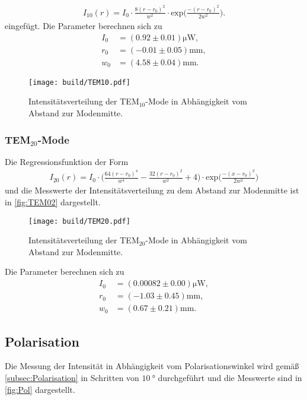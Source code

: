 \begin{align*}
  I_{10}(r) = I_0 \cdot \frac{8(r-r_0)^2}{w^2} \cdot \text{exp}\Biggl(\frac{-(r-r_0)^2}{2 w^2}\Biggr).
\end{align*}
eingefügt. Die Parameter berechnen sich zu
\begin{align*}
  I_{0} &= (0.92 \pm 0.01) \si{\micro\W},\\
  r_0 &= (-0.01 \pm 0.05) \si{\milli\meter},\\
  w_0 &= (4.58 \pm 0.04) \si{\milli\meter}.
\end{align*}

\begin{figure}[H]
  \centering
  \texttt{[image: build/TEM10.pdf]}
  \caption {Intensitätsverteilung der TEM$_{10}$-Mode in Abhängigkeit vom Abstand zur Modenmitte.}
  \label{fig:TEM10}
\end{figure}

\subsubsection{TEM$_{20}$-Mode}
\label{subsubsec:20Mode}
Die Regressionsfunktion der Form
\begin{align*}
  I_{20}(r) = I_0 \cdot \Biggl(\frac{64(r-r_0)^4}{w^4}-\frac{32(r-r_0)^2}{w^2}+4\Biggr) \cdot \text{exp}\Biggl(\frac{-(x-r_0)^2}{2 w^2}\Biggr)
\end{align*}
und die Messwerte der Intensitätsverteilung zu dem Abstand zur Modenmitte ist in \autoref{fig:TEM02} dargestellt.
\begin{figure}[H]
  \centering
  \texttt{[image: build/TEM20.pdf]}
  \caption {Intensitätsverteilung der TEM$_{20}$-Mode in Abhängigkeit vom Abstand zur Modenmitte.}
  \label{fig:TEM20}
\end{figure}

Die Parameter berechnen sich zu
\begin{align*}
  I_{0} &= (0.00082 \pm 0.00) \si{\micro\W},\\
  r_0 &= (-1.03 \pm 0.45) \si{\milli\meter},\\
  w_0 &= (0.67 \pm 0.21) \si{\milli\meter}.
\end{align*}

\subsection{Polarisation}
\label{sub:Polarisation}

Die Messung der Intensität in Abhängigkeit vom Polarisationswinkel wird gemäß \autoref{subsec:Polarisation}
in Schritten von $\qty{10}{\degree}$ durchgeführt und die Messwerte sind in
\autoref{fig:Pol} dargestellt.

